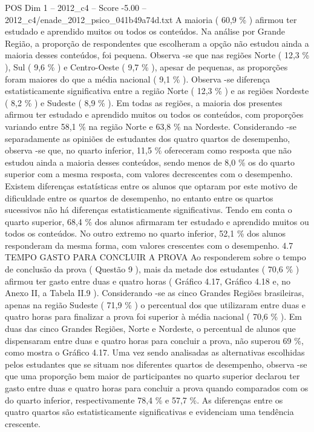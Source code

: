 \begin{textsample}{POS Dim 1 – 2012\_c4 – Score -5.00 – 2012\_c4/enade\_2012\_psico\_041b49a74d.txt}
A maioria ( 60,9 \% ) afirmou ter estudado e aprendido muitos ou todos os conteúdos.
Na análise por Grande Região, a proporção de respondentes que escolheram a opção não estudou ainda a maioria desses conteúdos, foi pequena.
Observa -se que nas regiões Norte ( 12,3 \% ), Sul ( 9,6 \% ) e Centro-Oeste ( 9,7 \% ), apesar de pequenas, as proporções foram maiores do que a média nacional ( 9,1 \% ).
Observa -se diferença estatisticamente significativa entre a região Norte ( 12,3 \% ) e as regiões Nordeste ( 8,2 \% ) e Sudeste ( 8,9 \% ).
Em todas as regiões, a maioria dos presentes afirmou ter estudado e aprendido muitos ou todos os conteúdos, com proporções variando entre 58,1 \% na região Norte e 63,8 \% na Nordeste.
Considerando -se separadamente as opiniões de estudantes dos quatro quartos de desempenho, observa -se que, no quarto inferior, 11,5 \% ofereceram como resposta que não estudou ainda a maioria desses conteúdos, sendo menos de 8,0 \% os do quarto superior com a mesma resposta, com valores decrescentes com o desempenho.
Existem diferenças estatísticas entre os alunos que optaram por este motivo de dificuldade entre os quartos de desempenho, no entanto entre os quartos sucessivos não há diferenças estatisticamente significativas.
Tendo em conta o quarto superior, 68,4 \% dos alunos afirmaram ter estudado e aprendido muitos ou todos os conteúdos.
No outro extremo no quarto inferior, 52,1 \% dos alunos responderam da mesma forma, com valores crescentes com o desempenho. 4.7 TEMPO GASTO PARA CONCLUIR A PROVA Ao responderem sobre o tempo de conclusão da prova ( Questão 9 ), mais da metade dos estudantes ( 70,6 \% ) afirmou ter gasto entre duas e quatro horas ( Gráfico 4.17, Gráfico 4.18 e, no Anexo II, a Tabela II.9 ).
Considerando -se as cinco Grandes Regiões brasileiras, apenas na região Sudeste ( 71,9 \% ) o percentual dos que utilizaram entre duas e quatro horas para finalizar a prova foi superior à média nacional ( 70,6 \% ).
Em duas das cinco Grandes Regiões, Norte e Nordeste, o percentual de alunos que dispensaram entre duas e quatro horas para concluir a prova, não superou 69 \%, como mostra o Gráfico 4.17.
Uma vez sendo analisadas as alternativas escolhidas pelos estudantes que se situam nos diferentes quartos de desempenho, observa -se que uma proporção bem maior de participantes no quarto superior declarou ter gasto entre duas e quatro horas para concluir a prova quando comparados com os do quarto inferior, respectivamente 78,4 \% e 57,7 \%.
As diferenças entre os quatro quartos são estatisticamente significativas e evidenciam uma tendência crescente.

\end{textsample}
